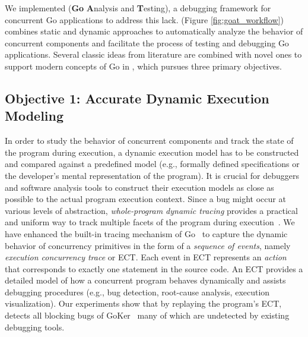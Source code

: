 We implemented \goat (\textbf{Go} \textbf{A}nalysis and \textbf{T}esting), a debugging framework for concurrent Go applications to address this lack.
%
\goat (Figure \ref{fig:goat_workflow}) combines static and dynamic approaches to automatically analyze the behavior of concurrent components and facilitate the process of testing and debugging Go applications.
%
%
Several classic ideas from literature are combined with novel ones to support modern concepts of Go in \goat, which pursues three primary objectives.
\\
\subsection{Objective 1: Accurate Dynamic Execution Modeling}
In order to study the behavior of concurrent components and track the state of the program during execution, a dynamic execution model has to be constructed and compared against a predefined model (e.g., formally defined specifications or the developer's mental representation of the program).
%
It is crucial for debuggers and software analysis tools to construct their execution models as close as possible to the actual program execution context.
%
Since a bug might occur at various levels of abstraction, \textit{whole-program dynamic tracing} provides a practical and uniform way to track multiple facets of the program during execution~\cite{diffTrace}.
%
We have enhanced the built-in tracing mechanism of Go~\cite{ect-arxiv} to capture the dynamic behavior of concurrency primitives in the form of a \textit{sequence of events}, namely \textit{execution concurrency trace} or ECT.
%
Each event in ECT represents an \textit{action} that corresponds to exactly one statement in the source code.
%
An ECT provides a detailed model of how a concurrent program behaves dynamically and assists debugging procedures (e.g., bug detection, root-cause analysis, execution visualization).
%
Our experiments show that by replaying the program's ECT, \goat detects all blocking bugs of GoKer~\cite{yuan-gobench-cgo21} many of which are undetected by existing debugging tools.

